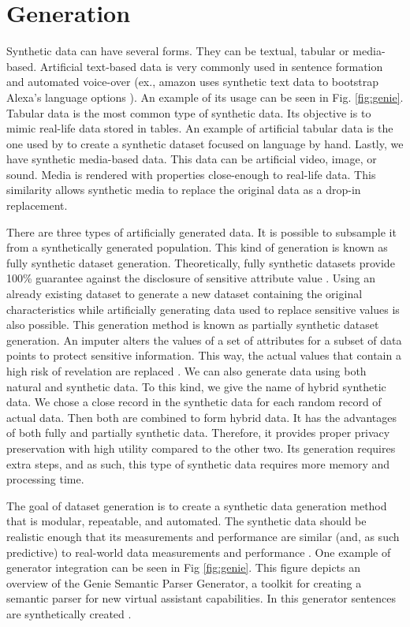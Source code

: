 \chapter{Generation} \label{chap:generation}
Synthetic data can have several forms. They can be textual, tabular or media-based. Artificial text-based data is very commonly used in sentence formation and automated voice-over (ex., amazon uses synthetic text data to bootstrap Alexa's language options \citep{kollar2018alexa}). An example of its usage can be seen in Fig. \ref{fig:genie}. Tabular data is the most common type of synthetic data. Its objective is to mimic real-life data stored in tables. An example of artificial tabular data is the one used by \cite{toutanova2016dataset} to create a synthetic dataset focused on language by hand. Lastly, we have synthetic media-based data. This data can be artificial video, image, or sound. Media is rendered with properties close-enough to real-life data. This similarity allows synthetic media to replace the original data as a drop-in replacement.

There are three types of artificially generated data. It is possible to subsample it from a synthetically generated population. This kind of generation is known as fully synthetic dataset generation. Theoretically, fully synthetic datasets provide 100\% guarantee against the disclosure of sensitive attribute value \citep{rubin1993statistical}.
Using an already existing dataset to generate a new dataset containing the original characteristics while artificially generating data used to replace sensitive values is also possible. This generation method is known as partially synthetic dataset generation. An imputer alters the values of a set of attributes for a subset of data points to protect sensitive information. This way, the actual values that contain a high risk of revelation are replaced \citep{dandekar2018comparative}. 
We can also generate data using both natural and synthetic data. To this kind, we give the name of hybrid synthetic data. We chose a close record in the synthetic data for each random record of actual data. Then both are combined to form hybrid data. It has the advantages of both fully and partially synthetic data. Therefore, it provides proper privacy preservation with high utility compared to the other two. Its generation requires extra steps, and as such, this type of synthetic data requires more memory and processing time.

The goal of dataset generation is to create a synthetic data generation method that is modular, repeatable, and automated. The synthetic data should be realistic enough that its measurements and performance are similar (and, as such predictive) to real-world data measurements and performance \citep{boggs2014synthetic}. One example of generator integration can be seen in Fig \ref{fig:genie}. This figure depicts an overview of the Genie Semantic Parser Generator, a toolkit for creating a semantic parser for new virtual assistant capabilities. In this generator sentences are synthetically created \citep{campagna2019genie}.



